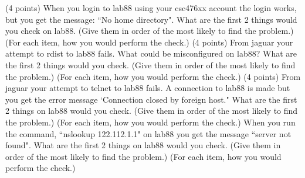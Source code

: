 \ques
(4 points)
When you login to {\ltt{}lab88} using your
{\ltt{}csc476xx} account the login works,
but you get the message:
``No home directory".
What are the first 2 things would you check on {\ltt{}lab88}.
(Give them in order of the most likely to find the problem.)
(For each item, how you would perform the check.)
\vfill
\ques
(4 points)
From {\ltt{}jaguar} your attempt to rdist to {\ltt{}lab88} fails.
What could be misconfigured on {\ltt{}lab88}?
What are the first 2 things would you check.
(Give them in order of the most likely to find the problem.)
(For each item, how you would perform the check.)
\vfill
\ques
(4 points)
From {\ltt{}jaguar} your attempt to telnet to {\ltt{}lab88} fails.
A connection to {\ltt{}lab88} is made but you get the error message
`Connection closed by foreign host."
What are the first 2 things on {\ltt{}lab88} would you check.
(Give them in order of the most likely to find the problem.)
(For each item, how you would perform the check.)
\vfill
\ques
When you run the command, ``{\ltt{}nslookup 122.112.1.1}"
on {\ltt{}lab88} you get the message ``{\ltt{}server not found}".
What are the first 2 things on {\ltt{}lab88} would you check.
(Give them in order of the most likely to find the problem.)
(For each item, how you would perform the check.)
\bye
